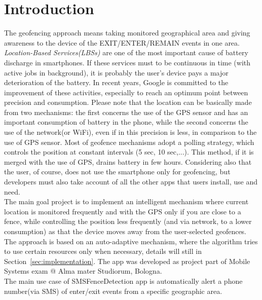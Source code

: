 \documentclass[conference]{IEEEtran}
\begin{document}
\section{Introduction}
The geofencing approach means taking monitored geographical area and giving awareness to the device of the EXIT/ENTER/REMAIN events in one area.
\textit{Location-Based Services(LBSs)} are one of the most important cause of battery discharge in smartphones.
If these services must to be continuous in time (with active jobs in background), it is probably the user's device pays a major deterioration of the battery.
In recent years, Google is committed to the improvement of these activities, especially to reach an optimum point between precision and consumption.
Please note that the location can be basically made from two mechanisms:
the first concerns the use of the GPS sensor and has an important consumption of battery in the phone, while the second concerns the use of the network(or WiFi), 
even if in this precision is less, in comparison to the use of GPS sensor.
Most of geofence mechanisms adopt a polling strategy, which controls the position at constant intervals (5 sec, 10 sec,...). 
This method, if it is merged with the use of GPS, drains battery in few hours. 
Considering also that the user, of course, does not use the smartphone only for geofencing, but developers must also take account of all the other apps that users install, use and need.\\
The main goal project is to implement an intelligent mechanism where current location is monitored frequently and with the GPS only if you are close to a fence, 
while controlling the position less frequently (and via network, to a lower consumption) as that the device moves away from the user-selected geofences.
The approach is based on an auto-adaptive mechanism, where the algorithm tries to use certain resources only when necessary, details will still in Section~\ref{sec:implementation}.
The app was developed as project part of Mobile Systems exam @ Alma mater Studiorum, Bologna.\\
The main use case of SMSFenceDetection app is automatically alert a phone number(via SMS) of enter/exit events from a specific geographic area. 
\end{document}

